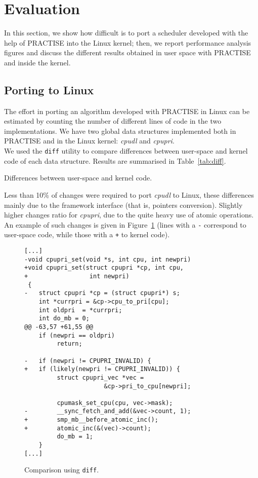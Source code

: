\section{Evaluation\label{sec:PRACTISE_eval}}

In this section, we show how difficult is to port a scheduler developed with the help of
PRACTISE into the Linux kernel; then, we report performance analysis figures and discuss
the different results obtained in user space with PRACTISE and inside the kernel.

\subsection{Porting to Linux\label{sec:PRACTISE_port_Linux}}

The effort in porting an algorithm developed with PRACTISE in Linux can be estimated by
counting the number of different lines of code in the two implementations. We have two
global data structures implemented both in PRACTISE and in the Linux kernel: \emph{cpudl}
and \emph{cpupri}.\\
We used the \texttt{diff} utility to compare differences between user-space and kernel code
of each data structure. Results are summarised in Table~\ref{tab:diff}.

\begin{table*}[htb]

\caption{Differences between user-space and kernel code.}
\label{tab:diff}
\end{table*}

Less than 10\% of changes were required to port \emph{cpudl} to Linux, these differences
mainly due to the framework interface (that is, pointers conversion). Slightly higher 
changes ratio for \emph{cpupri}, due to the quite heavy use of atomic operations.
An example of such changes is given in Figure~\ref{fig:ex-diff} (lines with a \texttt{-}
correspond to user-space code, while those with a \texttt{+} to kernel code).

\begin{figure}
  \centering
\begin{lstlisting}[frame=single]
[...]
-void cpupri_set(void *s, int cpu, int newpri)
+void cpupri_set(struct cpupri *cp, int cpu,
+                 int newpri)
 {
-   struct cpupri *cp = (struct cpupri*) s;
    int *currpri = &cp->cpu_to_pri[cpu];
    int oldpri  = *currpri;
    int do_mb = 0;
@@ -63,57 +61,55 @@
    if (newpri == oldpri)
         return;

-   if (newpri != CPUPRI_INVALID) {
+   if (likely(newpri != CPUPRI_INVALID)) {
         struct cpupri_vec *vec =
                      &cp->pri_to_cpu[newpri];

         cpumask_set_cpu(cpu, vec->mask);
-        __sync_fetch_and_add(&vec->count, 1);
+        smp_mb__before_atomic_inc();
+        atomic_inc(&(vec)->count);
         do_mb = 1;
    }
[...]
\end{lstlisting}
  \caption{Comparison using \texttt{diff}.}
\label{fig:ex-diff}
\end{figure}

